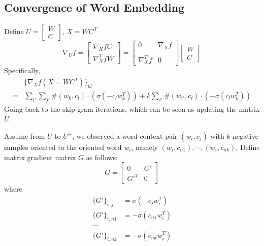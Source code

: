\documentclass[letterpaper]{article} %
\begin{document}
\subsection{Convergence of Word Embedding}
Define $U=\begin{bmatrix}W\\C\end{bmatrix}$, $X=WC^T$
\begin{equation}
\nabla_U f=\begin{bmatrix}\nabla_X fC\\\nabla^T_X fW\end{bmatrix}=\begin{bmatrix}0&\nabla_X f\\ \\\nabla^T_X f&0\end{bmatrix}\begin{bmatrix}W\\C\end{bmatrix}\label{eq: gradient}
\end{equation}
Specifically, 
\begin{equation}
\begin{split}
	&\{\nabla_X f(X=WC^T)\}_{kl}\\
	=&\sum_{i'}\sum_{j'}\#(w_k, c_l)\cdot(\sigma(-c_lw^T_k))+k\sum_{i'}\#(w_{i'}, c_l)\cdot(-\sigma(c_lw^T_k))\label{eq: grad f}
\end{split}
\end{equation}
Going back to the skip gram iterations, which can be seen as updating the matrix $U$.

Assume from $U$ to $U^+$, we observed a word-context pair $(w_i,c_j)$ with $k$ negative samples oriented to the oriented word $w_i$, namely $(w_i,c_{n1}),\cdots,(w_i,c_{nk})$, Define matrix gradient matrix $G$ as follows:
\begin{equation}
G=\begin{bmatrix}0&G'\\G'^T&0\end{bmatrix}
\end{equation}
where
\begin{equation}
\begin{split}
\{G'\}_{i,j}&=\sigma(-c_jw_i^T)\\
\{G'\}_{i,n1}&=-\sigma(c_{n1}w_i^T)\\
\cdots\\
\{G'\}_{i,nk}&=-\sigma(c_{nk}w_i^T)
\end{split}
\end{equation}
\end{document}
